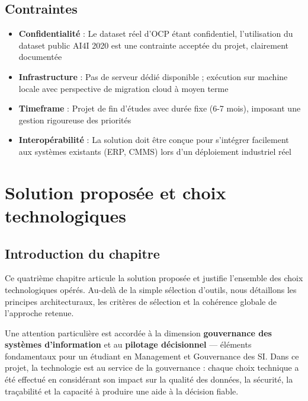 \documentclass[a4paper,12pt]{report}
\begin{document}
\section{Contraintes}

\begin{itemize}
    \item \textbf{Confidentialité} : Le dataset réel d'OCP étant confidentiel, l'utilisation du dataset public AI4I 2020 est une contrainte acceptée du projet, clairement documentée
    \item \textbf{Infrastructure} : Pas de serveur dédié disponible ; exécution sur machine locale avec perspective de migration cloud à moyen terme
    \item \textbf{Timeframe} : Projet de fin d'études avec durée fixe (6-7 mois), imposant une gestion rigoureuse des priorités
    \item \textbf{Interopérabilité} : La solution doit être conçue pour s'intégrer facilement aux systèmes existants (ERP, CMMS) lors d'un déploiement industriel réel
\end{itemize}


\chapter{Solution proposée et choix technologiques}

\section*{Introduction du chapitre}

Ce quatrième chapitre articule la solution proposée et justifie l'ensemble des choix technologiques opérés. Au-delà de la simple sélection d'outils, nous détaillons les principes architecturaux, les critères de sélection et la cohérence globale de l'approche retenue.

Une attention particulière est accordée à la dimension \textbf{gouvernance des systèmes d'information} et au \textbf{pilotage décisionnel} — éléments fondamentaux pour un étudiant en Management et Gouvernance des SI. Dans ce projet, la technologie est au service de la gouvernance : chaque choix technique a été effectué en considérant son impact sur la qualité des données, la sécurité, la traçabilité et la capacité à produire une aide à la décision fiable.
\end{document}
